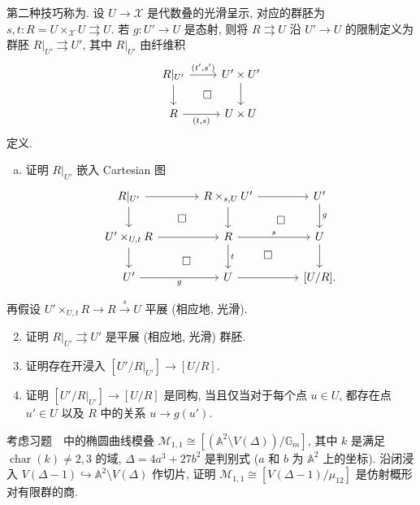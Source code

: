 第二种技巧称为. 设 $U\to\mathcal X$ 是代数叠的光滑呈示, 对应的群胚为 $s,t:R=U\times_{\mathcal X}U\rightrightarrows U$. 若 $g:U'\to U$ 是态射, 则将 $R\rightrightarrows U$ 沿 $U'\to U$ 的限制定义为群胚 $R|_{U'}\rightrightarrows U'$, 其中 $R|_{U'}$ 由纤维积
\[
\begin{tikzcd}
R|_{U'}\arrow[r,"{(t',s')}"]\arrow[d]\arrow[dr,phantom,"\square"]&U'\times U'\arrow[d]\\
R\arrow[r,"{(t,s)}"']&U\times U
\end{tikzcd}
\]
定义.
\begin{exercise}\label{src:4.4.20}
\begin{enumerate}[(a)]
\item 证明 $R|_{U'}$ 嵌入 Cartesian 图
\[
\begin{tikzcd}[column sep=large]
R|_{U'}\arrow[r]\arrow[d]\arrow[dr,phantom,"\square"]&R\times_{s,U}U'\arrow[r]\arrow[d]\arrow[dr,phantom,"\square"]&U'\arrow[d,"g"]\\
U'\times_{U,t}R\arrow[r]\arrow[d]\arrow[dr,phantom,"\square"]&R\arrow[r,"s"]\arrow[d,"t"]\arrow[dr,phantom,"\square"]&U\arrow[d]\\
U'\arrow[r,"g"']&U\arrow[r]&{[U/R].}
\end{tikzcd}
\]
\end{enumerate}
再假设 $U'\times_{U,t}R\to R\xrightarrow{s}U$ 平展 (相应地, 光滑).
\begin{enumerate}[(1)]\setcounter{enumi}{1}
\item 证明 $R|_{U'}\rightrightarrows U'$ 是平展 (相应地, 光滑) 群胚.
\item 证明存在开浸入 $[U'/R|_{U'}]\to[U/R]$.
\item 证明 $[U'/R|_{U'}]\to[U/R]$ 是同构, 当且仅当对于每个点 $u\in U$, 都存在点 $u'\in U$ 以及 $R$ 中的关系 $u\to g(u')$.
\end{enumerate}
\end{exercise}
\begin{exercise}[再论椭圆曲线的模]\label{src:4.4.21}
考虑习题~~中的椭圆曲线模叠 $\mathcal M_{1,1}\cong[(\mathbb A^2\setminus V(\Delta))/\mathbb G_m]$, 其中 $k$ 是满足 $\operatorname{char}(k)\ne2,3$ 的域, $\Delta=4a^3+27b^2$ 是判别式 ($a$ 和 $b$ 为 $\mathbb A^2$ 上的坐标). 沿闭浸入 $V(\Delta-1)\hookrightarrow\mathbb A^2\setminus V(\Delta)$ 作切片, 证明 $\mathcal M_{1,1}\cong[V(\Delta-1)/\mu_{12}]$ 是仿射概形对有限群的商.
\end{exercise}
